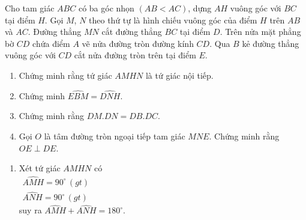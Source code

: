 \begin{ex}%
    Cho tam giác $ABC$ có ba góc nhọn $(AB<AC)$, dựng $AH$ vuông góc với $BC$ tại điểm $H$. Gọi $M$, $N$ theo thứ tự là hình chiếu vuông góc của điểm $H$ trên $AB$ và $AC$. Đường thẳng $MN$ cắt đường thẳng $BC$ tại điểm $D$. Trên nửa mặt phẳng bờ $CD$ chứa điểm $A$ vẽ nửa đường tròn đường kính $CD$. Qua $B$ kẻ đường thẳng vuông góc với $CD$ cắt nửa đường tròn trên tại điểm $E$.
    \begin{enumerate}
        \item Chứng minh rằng tứ giác $AMHN$ là tứ giác nội tiếp.
        \item Chứng minh $\widehat{EBM}=\widehat{DNH}$.
        \item Chứng minh rằng $DM.DN=DB.DC$.
        \item Gọi $O$ là tâm đường tròn ngoại tiếp tam giác $MNE$. Chứng minh rằng $OE\perp DE$.
    \end{enumerate}
\loigiai
    {
    \begin{center}
    \end{center}
    \begin{enumerate}
        \item Xét tứ giác $AMHN$ có \\
        $
        \begin{aligned}
        \widehat{AMH}=90^\circ\, (gt)\\
        \widehat{ANH}=90^\circ\, (gt)
        \end{aligned}
        $\\
        suy ra $ \widehat{AMH}+ \widehat{ANH}=180^\circ$.\\

\end{enumerate}}
\end{ex}
